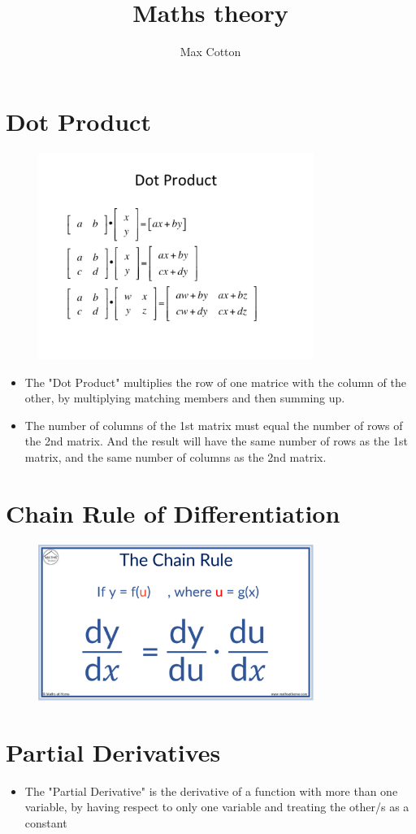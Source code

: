 \documentclass[10pt,a4paper]{article}
\title{Maths theory}
\author{Max Cotton}
\date{}
\begin{document}
\maketitle

\section{Dot Product}

\begin{figure}[h!]
\centering
\includegraphics[width=0.8\textwidth]{src/images/dot-product.png}
\end{figure}

\begin{itemize}
    \item The "Dot Product" multiplies the row of one matrice with the column of the other, by multiplying matching members and then summing up. 
    \item The number of columns of the 1st matrix must equal the number of rows of the 2nd matrix. And the result will have the same number of rows as the 1st matrix, and the same number of columns as the 2nd matrix.
\end{itemize}

\section{Chain Rule of Differentiation}

\begin{figure}[h!]
\centering
\includegraphics[width=0.8\textwidth]{src/images/chain-rule.png}
\end{figure}

\section{Partial Derivatives}

\begin{itemize}
    \item The "Partial Derivative" is the derivative of a function with more than one variable, by having respect to only one variable and treating the other/s as a constant
\end{itemize}
\end{document}
